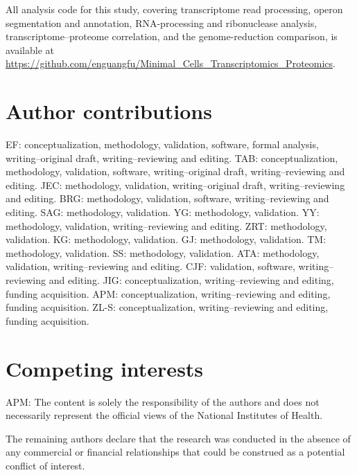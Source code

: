 All analysis code for this study, covering transcriptome read processing, operon segmentation and annotation, RNA-processing and ribonuclease analysis, transcriptome--proteome correlation, and the genome-reduction comparison, is available at \url{https://github.com/enguangfu/Minimal_Cells_Transcriptomics_Proteomics}.


\section*{Author contributions}

EF: conceptualization, methodology, validation, software, formal analysis, writing–original draft, writing–reviewing and editing. TAB: conceptualization, methodology, validation, software, writing–original draft, writing–reviewing and editing. JEC: methodology, validation, writing–original draft, writing–reviewing and editing. BRG: methodology, validation, software, writing–reviewing and editing. SAG: methodology, validation. YG: methodology, validation. YY: methodology, validation, writing–reviewing and editing. ZRT: methodology, validation. KG: methodology, validation. GJ: methodology, validation. TM: methodology, validation. SS: methodology, validation. ATA: methodology, validation, writing–reviewing and editing. CJF: validation, software, writing–reviewing and editing. JIG: conceptualization, writing–reviewing and editing, funding acquisition. APM: conceptualization, writing–reviewing and editing, funding acquisition. ZL-S: conceptualization, writing–reviewing and editing, funding acquisition.

\section*{Competing interests}

APM: The content is solely the responsibility of the authors and does not necessarily represent the official views of the National Institutes of Health.

The remaining authors declare that the research was conducted in the absence of any commercial or financial relationships that could be construed as a potential conflict of interest.